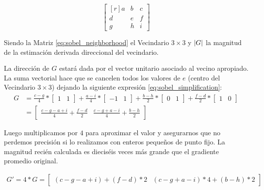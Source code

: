\documentclass[pregrado]{tesis-usb} %
\DeclarePairedDelimiter\abs{\lvert}{\rvert}%
\begin{document}
\begin{equation}
\begin{bmatrix*}[r]\label{eq:sobel_neighborhood}
a & b & c \\
d & e & f \\
g & h & i
\end{bmatrix*}
\end{equation}

Siendo la Matriz \ref{eq:sobel_neighborhood} el Vecindario $3\times 3$ y $\abs*{G}$ la magnitud de la estimación derivada direccional del vecindario.

La dirección de $G$ estará dada por el vector unitario asociado al vecino apropiado. La suma vectorial hace que se cancelen todos los valores de $e$ (centro del Vecindario $3\times 3$) dejando la siguiente expresión \ref{eq:sobel_simplification}:
\begin{equation}\label{eq:sobel_simplification}
\begin{split}
	G & =\frac{c-g}{4}*\begin{bmatrix*}1 & 1\end{bmatrix*}+\frac{a-i}{4}*\begin{bmatrix*}-1 & 1\end{bmatrix*}+\frac{b-h}{2}*\begin{bmatrix*}0 & 1\end{bmatrix*}+\frac{f-d}{2}*\begin{bmatrix*}1 & 0\end{bmatrix*} \\ & =\begin{bmatrix*}\frac{c-g-a+i}{4}+\frac{f-d}{2} & \frac{c-g+a-i}{4}+\frac{b-h}{2}\end{bmatrix*}
\end{split}
\end{equation}

Luego multiplicamos por $4$ para aproximar el valor y asegurarnos que no perdemos precisión si lo realizamos con enteros pequeños de punto fijo. La magnitud recién calculada es dieciséis veces más grande que el gradiente promedio original.

\begin{equation}\label{eq:sobel_approximation}
\begin{split}
G' = 4 * G =\begin{bmatrix*}(c-g-a+i)+(f-d)*2 & (c-g+a-i)*4+(b-h)*2\end{bmatrix*}
\end{split}
\end{equation}
\end{document}
